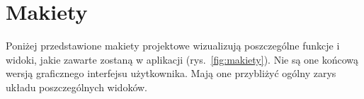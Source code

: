 

\section{Makiety}
Poniżej przedstawione makiety projektowe wizualizują poszczególne funkcje i widoki, jakie zawarte zostaną w aplikacji (rys.~\ref{fig:makiety}).
Nie są one końcową wersją graficznego interfejsu użytkownika. Mają one przybliżyć ogólny zarys układu poszczególnych widoków.
